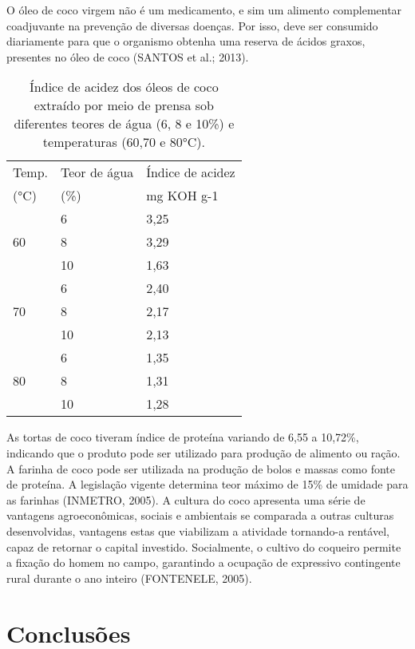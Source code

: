 \documentclass[article,12pt,onesidea,4paper,english,brazil]{abntex2}
\begin{document}
O óleo de coco virgem não é um medicamento, e sim um alimento complementar coadjuvante na prevenção de diversas doenças. Por isso, deve ser consumido diariamente para que o organismo obtenha uma reserva de ácidos graxos, presentes no óleo de coco (SANTOS et al.; 2013).

\begin{table}[]
	\centering
	\caption{Índice de acidez dos óleos de coco extraído por meio de prensa sob diferentes teores de água (6, 8 e 10\%) e temperaturas (60,70 e 80°C).}
	\label{my-label}
	\begin{tabular}{lll}
		\hline
		Temp. & Teor de água & Índice de acidez \\
		(°C)  & (\%)         & mg KOH g-1       \\
		\hline
		& 6            & 3,25             \\
		60    & 8            & 3,29             \\
		& 10           & 1,63             \\
		\hline
		& 6            & 2,40             \\
		70    & 8            & 2,17             \\
		& 10           & 2,13             \\
		\hline
		& 6            & 1,35             \\
		80    & 8            & 1,31             \\
		& 10           & 1,28 \\
		\hline            
	\end{tabular}
\end{table}

As tortas de coco tiveram índice de proteína variando de 6,55 a 10,72\%, indicando que o produto pode ser utilizado para produção de alimento ou ração. A farinha de coco pode ser utilizada na produção de bolos e massas como fonte de proteína. A legislação vigente determina teor máximo de 15\% de umidade para as farinhas (INMETRO, 2005). A cultura do coco apresenta uma série de vantagens agroeconômicas, sociais e ambientais se comparada a outras culturas desenvolvidas, vantagens estas que viabilizam a atividade tornando-a rentável, capaz de retornar o capital investido. Socialmente, o cultivo do coqueiro permite a fixação do homem no campo, garantindo a ocupação de expressivo contingente rural durante o ano inteiro (FONTENELE, 2005).
	
	\section*{Conclusões}
	
\end{document}

